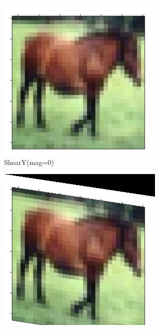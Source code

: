 \documentclass[onecolumn]{ujarticle}   %
\begin{document}
\begin{figure}[h]
      \begin{subfigure}{0.3\columnwidth}
        \centering
        \includegraphics[width=1.0\columnwidth]{transform_test/ShearY_0.png}
        \caption{ShearY(mag=0)}
        \label{fig:ShearY_0}
      \end{subfigure}
      \begin{subfigure}{0.3\columnwidth}
        \centering
        \includegraphics[width=1.0\columnwidth]{transform_test/ShearY_15.png}

\end{subfigure}
\end{figure}
\end{document}
